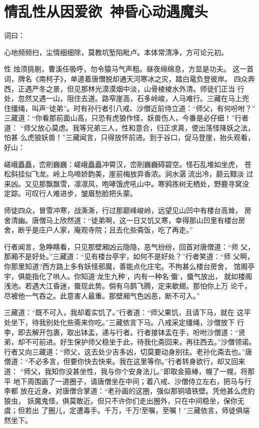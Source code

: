 \chapter{情乱性从因爱欲~神昏心动遇魔头}

词曰：

心地频频扫，尘情细细除，莫教坑堑陷毗卢。本体常清净，方可论元初。

性
烛须挑剔，曹溪任吸呼，勿令猿马气声粗。昼夜绵绵息，方显是功夫。
这一首词，牌名《南柯子》，单道着唐僧脱却通天河寒冰之灾，踏白鼋负登彼岸。
四众奔西，正遇严冬之景，但见那林光漠漠烟中淡，山骨棱棱水外清。师徒们正当
行处，忽然又遇一山，阻住去道。路窄崖高，石多岭峻，人马难行。三藏在马上兜
住缰绳，叫声“徒弟”。时有孙行者引八戒、沙僧近前侍立道：“师父，有何吩咐？”
三藏道：“你看那前面山高，只恐有虎狼作怪，妖兽伤人，今番是必仔细！”行者道：
“师父放心莫虑。我等兄弟三人，性和意合，归正求真，使出荡怪降妖之法，怕甚
么虎狼妖兽！”三藏闻言，只得放怀前进。到于谷口，促马登崖，抬头观看，好山：

嵯峨矗矗，峦削巍巍：嵯峨矗矗冲霄汉，峦削巍巍碍碧空。怪石乱堆如坐虎，
苍松斜挂似飞龙。岭上鸟啼娇韵美，崖前梅放异香浓。涧水潺流出冷，巅云黯淡
过来凶。又见那飘飘雪，凛凛风，咆哮饿虎吼山中。寒鸦拣树无栖处，野鹿寻窝没
定踪。可叹行人难进步，皱眉愁脸把头蒙。

师徒四众，冒雪冲寒，战澌澌，行过那巅峰峻岭，远望见山凹中有楼台高耸，
房舍清幽。唐僧马上欣然道：“徒弟啊，这一日又饥又寒，幸得那山凹里有楼台房
舍，断乎是庄户人家，庵观寺院；且去化些斋饭，吃了再走。”

行者闻言，急睁睛看，只见那壁厢凶云隐隐，恶气纷纷，回首对唐僧道：“师
父，那厢不是好处。”三藏道：“见有楼台亭宇，如何不是好处？”行者笑道：“师
父啊，你那里知道?西方路上多有妖怪邪魔，善能点化庄宅。不拘甚么楼台房舍，
馆阁亭宇，俱能指化了哄人。你知道‘龙生九种’，内有一种名‘蜃’，蜃气放出，
就如楼阁浅池。若遇大江昏迷，蜃现此势。倘有乌鹊飞腾，定来歇翅。那怕你上万
论千，尽被他一气吞之。此意害人最重。那壁厢气色凶恶，断不可入。”

三藏道：“既不可入，我却着实饥了。”行者道：“师父果饥，且请下马，就在
这平处坐下，待我别处化些斋来你吃。”三藏依言下马。八戒采定缰绳，沙僧放下
行李，即去解开包裹，取出钵盂，递与行者。行者接钵盂在手，吩咐沙僧道：“贤
弟，却不可前进。好生保护师父稳坐于此，待我化斋回来，再往西去。”沙僧领诺。
行者又向三藏道：“师父，这去处少吉多凶，切莫要动身别往。老孙化斋去也。”唐
僧道：“不必多言，但要你快去快来。我在这里等你。”行者转身欲行，却又回来道：
“师父，我知你没甚坐性，我与你个安身法儿。”即取金箍棒，幌了一幌，将那平
地下周围画了一道圈子，请唐僧坐在中间；着八戒、沙僧侍立左右，把马与行李都
放在近身。对唐僧合掌道：“老孙画的这圈，强似那铜墙铁壁。凭他甚么虎豹狼虫，
妖魔鬼怪，俱莫敢近。但只不许你们走出圈外，只在中间稳坐，保你无虞；但若出
了圈儿，定遭毒手。千万，千万!至嘱，至嘱！”三藏依言，师徒俱端然坐下。

